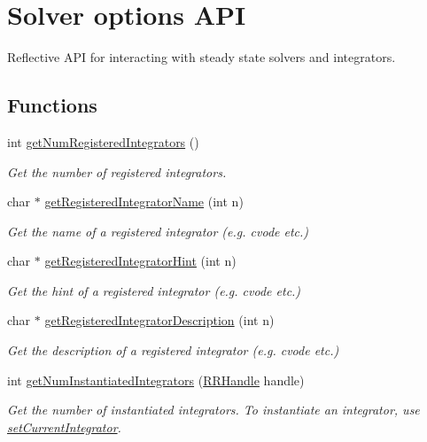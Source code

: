 \hypertarget{group__simopts}{\section{Solver options A\+P\+I}
\label{group__simopts}
}


Reflective A\+P\+I for interacting with steady state solvers and integrators.  


\subsection*{Functions}
\begin{DoxyCompactItemize}
\item 
int \hyperlink{group__simopts_ga53617fbabff8088e10c8bc5deee40353}{get\+Num\+Registered\+Integrators} ()
\begin{DoxyCompactList}\small\item\em Get the number of registered integrators. \end{DoxyCompactList}\item 
char $\ast$ \hyperlink{group__simopts_ga5713f7cea279fc58aa497615ebb7ddbf}{get\+Registered\+Integrator\+Name} (int n)
\begin{DoxyCompactList}\small\item\em Get the name of a registered integrator (e.\+g. cvode etc.) \end{DoxyCompactList}\item 
char $\ast$ \hyperlink{group__simopts_ga6d22f11e49e89336e5d795e620e55530}{get\+Registered\+Integrator\+Hint} (int n)
\begin{DoxyCompactList}\small\item\em Get the hint of a registered integrator (e.\+g. cvode etc.) \end{DoxyCompactList}\item 
char $\ast$ \hyperlink{group__simopts_ga3b8047489d530224b71e5ea64e898f85}{get\+Registered\+Integrator\+Description} (int n)
\begin{DoxyCompactList}\small\item\em Get the description of a registered integrator (e.\+g. cvode etc.) \end{DoxyCompactList}\item 
int \hyperlink{group__simopts_ga492555873a0da5f8aa167eeafb7d7d21}{get\+Num\+Instantiated\+Integrators} (\hyperlink{rrc__types_8h_a1d68f0592372208fa5a5f2799ea4b3ae}{R\+R\+Handle} handle)
\begin{DoxyCompactList}\small\item\em Get the number of instantiated integrators.  To instantiate an integrator, use \hyperlink{group__simopts_ga7d4664a6a66a2a9b224db95b751127fe}{set\+Current\+Integrator}. \end{DoxyCompactList}\item 

\end{DoxyCompactItemize}
